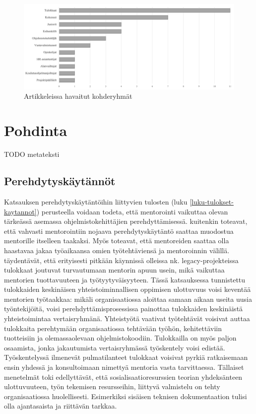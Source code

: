 \documentclass[utf8]{gradu3}
\begin{document}
\begin{figure}[h]
    \centering
    \includegraphics[width=\textwidth]{media/kohderyhmat.png}
    \caption{Artikkeleissa havaitut kohderyhmät}
    \label{kuvio:kohderyhmat}
\end{figure}

\chapter{Pohdinta}
\label{paaluku-pohdinta}

TODO metateksti

\section{Perehdytyskäytännöt}

Katsauksen perehdytyskäytäntöihin liittyvien tulosten (luku \ref{luku-tulokset-kaytannot}) perusteella voidaan todeta, että mentorointi vaikuttaa olevan tärkeässä asemassa ohjelmistokehittäjien perehdyttämisessä. \textcite{viviani-murphy-2019} kuitenkin toteavat, että vahvasti mentorointiin nojaava perehdytyskäytäntö saattaa muodostua mentorille itselleen taakaksi. Myös \textcite{moe-ym-2020} toteavat, että mentoreiden saattaa olla haastavaa jakaa työaikaansa omien työtehtäviensä ja mentoroinnin välillä. \textcite{britto-ym-2017} täydentävät, että erityisesti pitkään käynnissä olleissa nk. legacy-projekteissa tulokkaat joutuvat turvautumaan mentorin apuun usein, mikä vaikuttaa mentorien tuottavuuteen ja työtyytyväisyyteen. Tässä katsauksessa tunnistettu tulokkaiden keskinäisen yhteistoiminnallisen oppimisen ulottuvuus voisi keventää mentorien työtaakkaa: mikäli organisaatiossa aloittaa samaan aikaan useita uusia työntekijöitä, voisi perehdyttämisprosessissa painottaa tulokkaiden keskinäistä yhteistoimintaa vertaisryhmänä. Yhteistyötä vaativat työtehtävät voisivat auttaa tulokkaita perehtymään organisaatiossa tehtävään työhön, kehitettäviin tuotteisiin ja olemassaolevaan ohjelmistokoodiin. Tulokkailla on myös paljon osaamista, jonka jakautumista vertaisryhmässä työskentely voisi edistää. Työskentelyssä ilmenevät pulmatilanteet tulokkaat voisivat pyrkiä ratkaisemaan ensin yhdessä ja konsultoimaan nimettyä mentoria vasta tarvittaessa. Tällaiset menetelmät toki edellyttävät, että sosialisaatioresurssien teorian yhdeksänteen ulottuvuuteen, työn tekemisen resursseihin, liittyvä valmistelu on tehty organisaatiossa huolellisesti. Esimerkiksi sisäisen teknisen dokumentaation tulisi olla ajantasaista ja riittävän tarkkaa.
\end{document}
